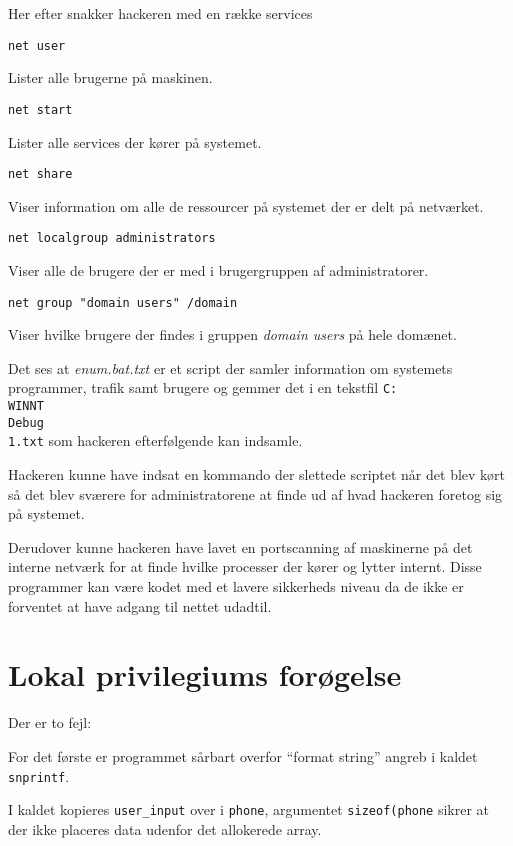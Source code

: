 \documentclass[10pt,a4paper,danish]{article}
\begin{document}
Her efter snakker hackeren med en række services

\begin{verbatim}
net user
\end{verbatim}
Lister alle brugerne på maskinen.

\begin{verbatim}
net start
\end{verbatim}
Lister alle services der kører på systemet.

\begin{verbatim}
net share
\end{verbatim}
Viser information om alle de ressourcer på systemet der er delt på netværket.

\begin{verbatim}
net localgroup administrators
\end{verbatim}
Viser alle de brugere der er med i brugergruppen af administratorer.

\begin{verbatim}
net group "domain users" /domain
\end{verbatim}
Viser hvilke brugere der findes i gruppen \textit{domain users} på hele domænet.


Det ses at \textit{enum.bat.txt} er et script der samler information om
systemets programmer, trafik samt brugere og gemmer det i en tekstfil \texttt{C:\\WINNT\\Debug\\1.txt} som
hackeren efterfølgende kan indsamle.

Hackeren kunne have indsat en kommando der slettede scriptet når det blev kørt
så det blev sværere for administratorene at finde ud af hvad hackeren foretog
sig på systemet.

Derudover kunne hackeren have lavet en portscanning af maskinerne på det interne
netværk for at finde hvilke processer der kører og lytter internt.
Disse programmer kan være kodet med et lavere sikkerheds niveau da de ikke er
forventet at have adgang til nettet udadtil.


\section{Lokal privilegiums forøgelse}

Der er to fejl:

For det første er programmet sårbart overfor ``format string'' angreb i kaldet
\texttt{snprintf}.

I kaldet kopieres \texttt{user\_input} over i \texttt{phone}, argumentet
\texttt{sizeof(phone} sikrer at der ikke placeres data udenfor det allokerede
array.
\end{document}
